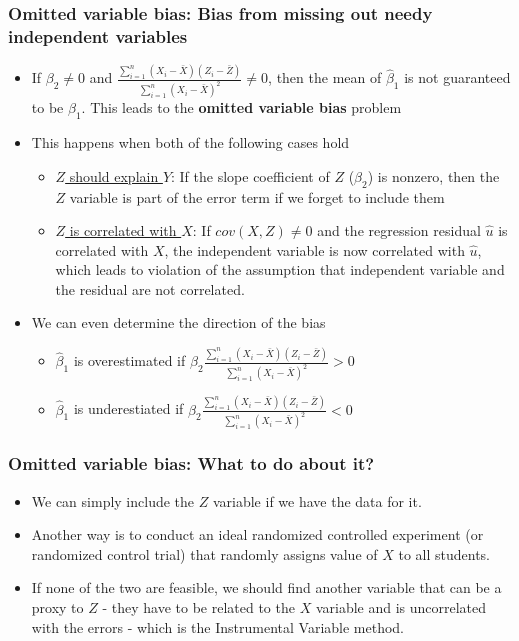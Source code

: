 \documentclass[aspectratio=169]{beamer}
\begin{document}
\begin{frame}
\frametitle{Omitted variable bias: Bias from missing out needy independent variables}
\begin{itemize}
\item If $\beta_2 \neq0$ and $\frac{\sum_{i=1}^n(X_i-\bar{X})(Z_i-\bar{Z})}{\sum_{i=1}^n(X_i-\bar{X})^2}\neq 0$, then the mean of $\hat{\beta}_1$ is not guaranteed to be $\beta_1$. This leads to the \textbf{omitted variable bias} problem
\item This happens when both of the following cases hold
\begin{itemize}
\item \underline{$Z$ should explain $Y$}: If the slope coefficient of $Z$ ($\beta_2$) is nonzero, then the $Z$ variable is part of the error term if we forget to include them
\item \underline{$Z$ is correlated with $X$}: If $cov(X,Z)\neq0$ and the regression residual $\hat{u}$ is correlated with $X$, the independent variable is now correlated with $\hat{u}$, which leads to violation of the assumption that independent variable and the residual are not correlated.
\end{itemize}
\item We can even determine the direction of the bias
\begin{itemize}
\item $\hat{\beta}_1$ is overestimated if $\beta_2\frac{\sum_{i=1}^n(X_i-\bar{X})(Z_i-\bar{Z})}{\sum_{i=1}^n(X_i-\bar{X})^2}>0$
\item $\hat{\beta}_1$ is underestiated  if $\beta_2\frac{\sum_{i=1}^n(X_i-\bar{X})(Z_i-\bar{Z})}{\sum_{i=1}^n(X_i-\bar{X})^2}<0$
\end{itemize}
\end{itemize}
\end{frame}

\begin{frame}
\frametitle{Omitted variable bias: What to do about it?}
\begin{itemize}
\item We can simply include the $Z$ variable if we have the data for it. 
\item Another way is to conduct an ideal randomized controlled experiment (or randomized control trial) that randomly assigns value of $X$ to all students.
\item If none of the two are feasible, we should find another variable that can be a proxy to $Z$ - they have to be related to the $X$ variable and is uncorrelated with the errors - which is the Instrumental Variable method.
\end{itemize}
\end{frame}
\end{document}
